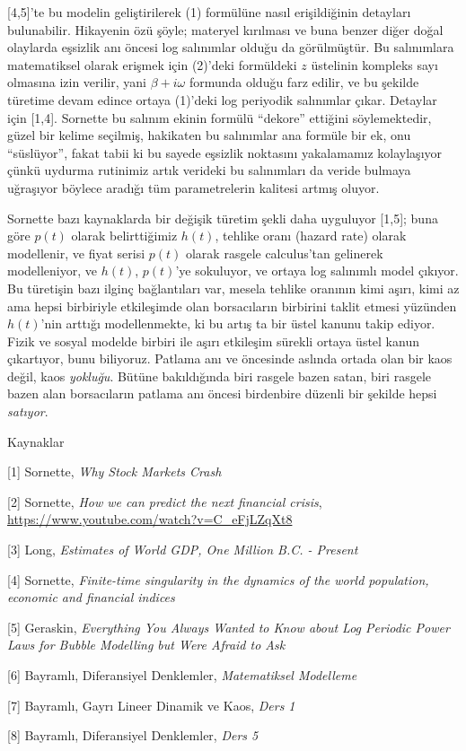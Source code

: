\documentclass[12pt,fleqn]{article}\usepackage{../../common}
\begin{document}
[4,5]'te bu modelin geliştirilerek (1) formülüne nasıl erişildiğinin
detayları bulunabilir. Hikayenin özü şöyle; materyel kırılması ve buna
benzer diğer doğal olaylarda eşsizlik anı öncesi log salınımlar olduğu da
görülmüştür. Bu salınımlara matematiksel olarak erişmek için (2)'deki
formüldeki $z$ üstelinin kompleks sayı olmasına izin verilir, yani $\beta +
i\omega$ formunda olduğu farz edilir, ve bu şekilde türetime devam edince
ortaya (1)'deki log periyodik salınımlar çıkar. Detaylar için
[1,4]. Sornette bu salınım ekinin formülü ``dekore'' ettiğini
söylemektedir, güzel bir kelime seçilmiş, hakikaten bu salınımlar ana
formüle bir ek, onu ``süslüyor'', fakat tabii ki bu sayede eşsizlik
noktasını yakalamamız kolaylaşıyor çünkü uydurma rutinimiz artık verideki
bu salınımları da veride bulmaya uğraşıyor böylece aradığı tüm
parametrelerin kalitesi artmış oluyor.

Sornette bazı kaynaklarda bir değişik türetim şekli daha uyguluyor [1,5];
buna göre $p(t)$ olarak belirttiğimiz $h(t)$, tehlike oranı (hazard rate)
olarak modellenir, ve fiyat serisi $p(t)$ olarak rasgele calculus'tan
gelinerek modelleniyor, ve $h(t)$, $p(t)$'ye sokuluyor, ve ortaya log
salınımlı model çıkıyor. Bu türetişin bazı ilginç bağlantıları var, mesela
tehlike oranının kimi aşırı, kimi az ama hepsi birbiriyle etkileşimde olan
borsacıların birbirini taklit etmesi yüzünden $h(t)$'nin arttığı
modellenmekte, ki bu artış ta bir üstel kanunu takip ediyor. Fizik ve
sosyal modelde birbiri ile aşırı etkileşim sürekli ortaya üstel kanun
çıkartıyor, bunu biliyoruz. Patlama anı ve öncesinde aslında ortada olan
bir kaos değil, kaos {\em yokluğu}. Bütüne bakıldığında biri rasgele bazen
satan, biri rasgele bazen alan borsacıların patlama anı öncesi birdenbire
düzenli bir şekilde hepsi {\em satıyor}. 

Kaynaklar

[1] Sornette, {\em Why Stock Markets Crash}

[2] Sornette, {\em How we can predict the next financial crisis}, \url{https://www.youtube.com/watch?v=C_eFjLZqXt8}

[3] Long, {\em Estimates of World GDP, One Million B.C. - Present}

[4] Sornette, {\em Finite-time singularity in the dynamics of the world population, economic and financial indices}

[5] Geraskin, {\em Everything You Always Wanted to Know about Log Periodic Power Laws for Bubble Modelling but Were Afraid to Ask}

[6] Bayramlı, Diferansiyel Denklemler, {\em Matematiksel Modelleme}

[7] Bayramlı, Gayrı Lineer Dinamik ve Kaos, {\em Ders 1}

[8] Bayramlı, Diferansiyel Denklemler, {\em Ders 5}
\end{document}
